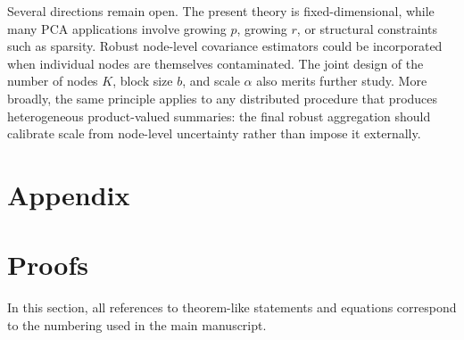 \documentclass[11pt]{article}
\begin{document}
Several directions remain open.  The present theory is fixed-dimensional, while
many PCA applications involve growing \(p\), growing \(r\), or structural
constraints such as sparsity.  Robust node-level covariance estimators could be
incorporated when individual nodes are themselves contaminated.  The joint design
of the number of nodes \(K\), block size \(b\), and scale \(\alpha\) also merits
further study.  More broadly, the same principle applies to any distributed
procedure that produces heterogeneous product-valued summaries: the final robust
aggregation should calibrate scale from node-level uncertainty rather than
impose it externally.





\newpage  
\appendix

\section*{Appendix}\label{app:main}


\renewcommand{\thesection}{\Alph{section}}

\setcounter{section}{0}

\section{Proofs}

In this section, all references to theorem-like statements and equations correspond to the numbering used in the main manuscript.
\end{document}
